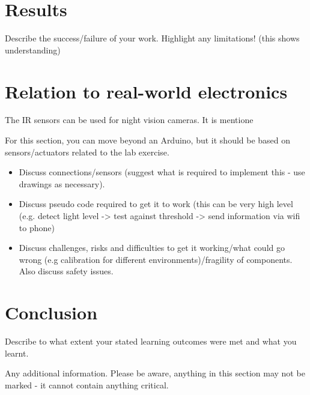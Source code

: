 \documentclass[journal]{IEEEtran}
\begin{document}
\section{Results}
Describe the success/failure of your work.
Highlight any limitations! (this shows understanding)

\section{Relation to real-world electronics}

The IR sensors can be used for night vision cameras. It is mentione

For this section, you can move beyond an Arduino, but it should be based on  sensors/actuators related to the lab exercise.


\begin{itemize}
  \item Discuss connections/sensors (suggest what is required to implement this - use drawings as necessary).
  \item Discuss pseudo code required to get it to work (this can be very high level (e.g. detect light level -> test against threshold -> send information via wifi to phone) 
  \item Discuss challenges, risks and difficulties to get it working/what could go wrong (e.g calibration for different environments)/fragility of components. Also discuss safety issues.
\end{itemize}

\section{Conclusion}
Describe to what extent your stated learning outcomes were met and what you learnt.




\appendix

Any additional information. Please be aware, anything in this section may not be marked - it cannot contain anything critical. 
\end{document}
